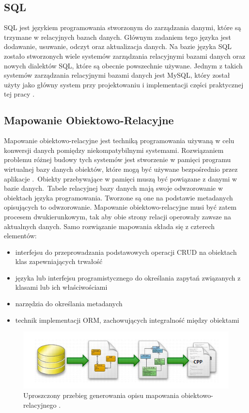 \documentclass[12pt]{report}
\begin{document}
\subsection{SQL}
	\indent SQL jest językiem programowania stworzonym do zarządzania danymi, które są trzymane w relacyjnych bazach danych. Głównym zadaniem tego języka jest dodawanie, usuwanie, odczyt oraz aktualizacja danych. Na bazie języka SQL zostało stworzonych wiele systemów zarządzania relacyjnymi bazami danych oraz nowych dialektów SQL, które są obecnie powszechnie używane. Jednym z takich systemów zarządzania relacyjnymi bazami danych jest MySQL, który został użyty jako główny system przy projektowaniu i implementacji części praktycznej tej pracy \cite{sql}.
\subsection{Mapowanie Obiektowo-Relacyjne}
	\indent Mapowanie obiektowo-relacyjne jest techniką programowania używaną w celu konwersji danych pomiędzy niekompatybilnymi systemami. Rozwiązaniem problemu różnej budowy tych systemów jest stworzenie w pamięci programu wirtualnej bazy danych obiektów, które mogą być używane bezpośrednio przez aplikacje \cite{hibernateInAction}.\ Obie\-kty przebywające w pa\-mięci muszą być powiązane z danymi w bazie danych.\ Tabele relacyjnej bazy danych mają swoje odwzorowanie w obiektach języka programowania. Tworzone są one na podstawie metadanych opisujących to odwzorowanie. Mapowanie obiektowo-relacyjne musi być zatem procesem dwukierunkowym, tak aby obie strony relacji operowały zawsze na aktualnych danych. Samo rozwiązanie mapowania składa się z czterech elementów:
	\begin{itemize}
	\item{interfejsu do przeprowadzania podstawowych operacji CRUD na obiektach klas zapewniających trwałość}
	\item{języka lub interfejsu programistycznego do określania zapytań związanych z klasami lub ich właściwościami}
	\item{narzędzia do określania metadanych}
	\item{technik implementacji ORM, zachowujących integralność między obiektami}
	\end{itemize}

	\begin{figure}[!ht]
		\centering
		\includegraphics[width=1\textwidth]{images/orm.png}
		\caption{Uproszczony przebieg generowania opisu mapowania obiektowo-relacyjnego \cite{ormimg}.}
	\end{figure}
\end{document}
